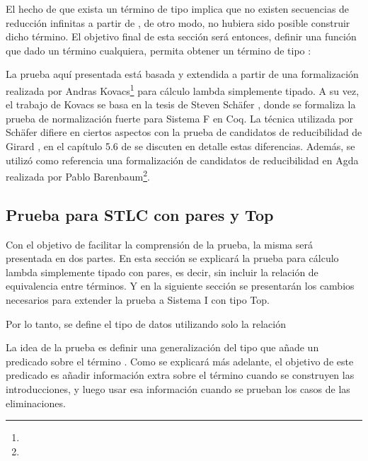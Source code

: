 El hecho de que exista un término de tipo   implica que no existen secuencias de reducción infinitas a partir de , de otro modo, no hubiera sido posible construir dicho término.
El objetivo final de esta sección será entonces, definir una función que dado un término cualquiera, permita obtener un término de tipo  :

\vspace{0.5em}
\AgdaSymbol{:}
\AgdaSymbol{\{}
\AgdaSymbol{\}}
\AgdaSymbol{(}
\AgdaSymbol{:}
\AgdaSymbol{)}
\vspace{0.5em}

La prueba aquí presentada está basada y extendida a partir de una formalización realizada por 
Andras Kovacs\footnote{} para cálculo lambda simplemente tipado.
A su vez, el trabajo de Kovacs se basa en la tesis de Steven Schäfer \cite{Schafer}, donde se formaliza la prueba de normalización fuerte para Sistema F en Coq.
La técnica utilizada por Schäfer difiere en ciertos aspectos con la prueba de candidatos de reducibilidad de Girard \cite{Girard}, en el capítulo 5.6 de \cite{Schafer} se discuten en detalle estas diferencias.
Además, se utilizó como referencia una formalización de candidatos de reducibilidad en Agda realizada por Pablo Barenbaum\footnote{}.

\subsection{Prueba para STLC con pares y Top}

Con el objetivo de facilitar la comprensión de la prueba, la misma será presentada en dos partes.
En esta sección se explicará la prueba para cálculo lambda simplemente tipado con pares, es decir, sin incluir la relación de equivalencia entre términos.
Y en la siguiente sección se presentarán los cambios necesarios para extender la prueba a Sistema I con tipo Top.

Por lo tanto, se define el tipo de datos  utilizando solo la relación \type{$\_\hookrightarrow\_$}


La idea de la prueba es definir una generalización del tipo  que añade un predicado sobre el término .
Como se explicará más adelante, el objetivo de este predicado es añadir información extra sobre el término cuando se construyen las introducciones, y luego usar esa información cuando se prueban los casos de las eliminaciones.

